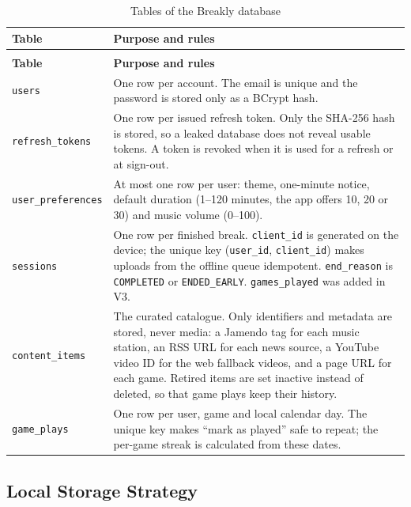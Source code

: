 \begingroup
\small
\renewcommand{\arraystretch}{1.2}
\begin{longtable}{|>{\raggedright\arraybackslash}p{3.0cm}|>{\raggedright\arraybackslash}p{11.3cm}|}
\caption{Tables of the Breakly database}\label{tab:data-model}\\ \hline
\textbf{Table} & \textbf{Purpose and rules} \\ \hline
\endfirsthead
\multicolumn{2}{c}{{\bfseries \tablename\ \thetable{} -- continued from previous page}} \\ \hline
\textbf{Table} & \textbf{Purpose and rules} \\ \hline
\endhead
\texttt{users} & One row per account. The email is unique and the password is stored only as a BCrypt hash. \\ \hline
\texttt{refresh\_tokens} & One row per issued refresh token. Only the SHA-256 hash is stored, so a leaked database does not reveal usable tokens. A token is revoked when it is used for a refresh or at sign-out. \\ \hline
\texttt{user\_preferences} & At most one row per user: theme, one-minute notice, default duration (1--120 minutes, the app offers 10, 20 or 30) and music volume (0--100). \\ \hline
\texttt{sessions} & One row per finished break. \texttt{client\_id} is generated on the device; the unique key (\texttt{user\_id}, \texttt{client\_id}) makes uploads from the offline queue idempotent. \texttt{end\_reason} is \texttt{COMPLETED} or \texttt{ENDED\_EARLY}. \texttt{games\_played} was added in V3. \\ \hline
\texttt{content\_items} & The curated catalogue. Only identifiers and metadata are stored, never media: a Jamendo tag for each music station, an RSS URL for each news source, a YouTube video ID for the web fallback videos, and a page URL for each game. Retired items are set inactive instead of deleted, so that game plays keep their history. \\ \hline
\texttt{game\_plays} & One row per user, game and local calendar day. The unique key makes ``mark as played'' safe to repeat; the per-game streak is calculated from these dates. \\ \hline
\end{longtable}
\endgroup

\subsection{Local Storage Strategy}
\label{sec:local-storage}

